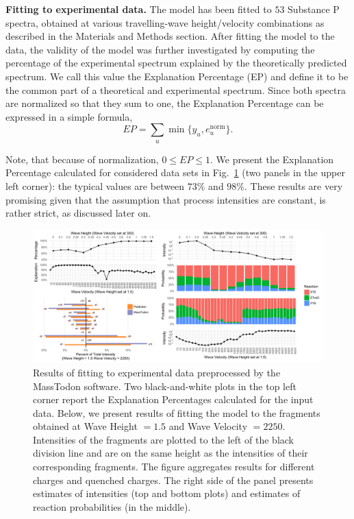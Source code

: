 \documentclass{llncs}
\begin{document}
        \textbf{Fitting to experimental data.} The model has been fitted to $53$ Substance P spectra, obtained at various travelling-wave height/velocity combinations as described in the Materials and Methods section. After fitting the model to the data, the validity of the model was further investigated by computing the percentage of the experimental spectrum explained by the theoretically predicted spectrum. We call this value the Explanation Percentage (EP) and define it to be the common part of a theoretical and experimental spectrum. Since both spectra are normalized so that they sum to one, the Explanation Percentage can be expressed in a simple formula,
        $$ EP = \sum_u \min\{y_u, e_u^\text{norm}\}.$$

        Note, that because of normalization, $0 \leq EP \leq 1$. We present the Explanation Percentage calculated for considered data sets in Fig.~\ref{fig::melon} (two panels in the upper left corner): the typical values are between $73\%$ and $98\%$. These results are very promising given that the assumption that process intensities are constant, is rather strict, as discussed later on.

        \begin{figure}[h]
                \center
                \includegraphics[width=\textwidth]{melon.png}
                \caption{ Results of fitting to experimental data preprocessed by the MassTodon software. Two black-and-white plots in the top left corner report the Explanation Percentages calculated for the input data. Below, we present results of fitting the model to the fragments obtained at Wave Height $= 1.5$ and Wave Velocity $= 2250$. Intensities of the  fragments are plotted to the left of the black division line and are on the same height as the intensities of their corresponding  fragments. The figure aggregates results for different charges and quenched charges. The right side of the panel presents estimates of intensities (top and bottom plots) and estimates of reaction probabilities (in the middle).
                }\label{fig::melon}
        \end{figure}
\end{document}
